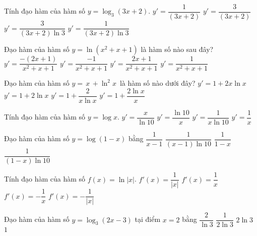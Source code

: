 \begin{ex}%
	Tính đạo hàm của hàm số $y=\log_3(3x+2)$.
	\choice
	{$y'=\dfrac{1}{(3x+2)}$}
	{$y'=\dfrac{3}{(3x+2)}$}
	{\True $y'=\dfrac{3}{(3x+2)\ln 3}$}
	{$y'=\dfrac{1}{(3x+2)\ln 3}$}
\end{ex}

\begin{ex}%
	Đạo hàm của hàm số $y=\ln\left(x^2+x+1\right)$ là hàm số nào sau đây?
	\choice
	{$y'=\dfrac{-(2x+1)}{x^2+x+1}$}
	{$y'=\dfrac{-1}{x^2+x+1}$}
	{\True $y'=\dfrac{2x+1}{x^2+x+1}$}
	{$y'=\dfrac{1}{x^2+x+1}$}
\end{ex}

\begin{ex}%
	Đạo hàm của hàm số $y=\,x\,+\ln ^2x\,$ là hàm số nào dưới đây?
	\choice
	{$y'=1+2x\ln x$}
	{$y'=1+2\ln x$}
	{$y'=1+\dfrac{2}{x\ln x}$}
	{\True $y'=1+\dfrac{2\ln x}{x}$}
\end{ex}

\begin{ex}%
	Tính đạo hàm của hàm số $y=\log x$.
	\choice
	{$y'=\dfrac{x}{\ln 10}$}
	{$y'=\dfrac{\ln 10}{x}$}
	{\True $y'=\dfrac{1}{x\ln 10}$}
	{$y'=\dfrac{1}{x}$}
\end{ex}

\begin{ex}%
	Đạo hàm của hàm số $y=\log (1-x)$ bằng
	\choice
	{$\dfrac{1}{x-1}$}
	{\True $\dfrac{1}{(x-1)\ln 10}$}
	{$\dfrac{1}{1-x}$}
	{$\dfrac{1}{(1-x)\ln 10}$}
\end{ex}

\begin{ex}%
	Tính đạo hàm của hàm số $f(x)=\ln |x|$.
	\choice
	{$f'(x)=\dfrac{1}{|x|}$}
	{\True $f'(x)=\dfrac{1}{x}$}
	{$f'(x)=-\dfrac{1}{x}$}
	{$f'(x)=-\dfrac{1}{|x|}$}
\end{ex}

\begin{ex}%
	Đạo hàm của hàm số $y=\log_3(2x-3)$ tại điểm $x=2$ bằng
	\choice
	{\True $\dfrac{2}{\ln 3}$}
	{$\dfrac{1}{2\ln 3}$}
	{$2\ln 3$}
	{$1$}
\end{ex}

